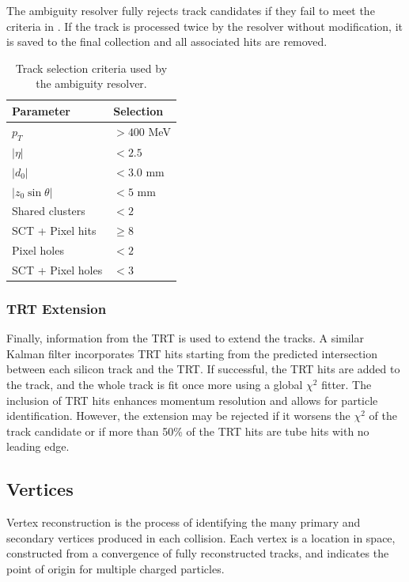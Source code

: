 The ambiguity resolver fully rejects track candidates if they fail to meet the criteria in .
If the track is processed twice by the resolver without modification, it is saved to the final collection and all associated hits are removed.

\begin{table}[h!]
    \centering
    \begin{tabular}{ll}
        \toprule
        Parameter           & Selection   \\
        \midrule
        $p_T$               & $> 400$ MeV \\
        $|\eta|$            & $< 2.5$     \\
        $|d_0|$             & $< 3.0$ mm  \\
        $|z_0 \sin \theta|$ & $< 5$ mm    \\
        Shared clusters     & $< 2$       \\
        SCT + Pixel hits    & $\geq 8$    \\
        Pixel holes         & $< 2$       \\
        SCT + Pixel holes   & $< 3$       \\
        \bottomrule
    \end{tabular}
    \caption{Track selection criteria used by the ambiguity resolver.}
    \label{tab:track_criteria}
\end{table}

\subsubsection{TRT Extension}

Finally, information from the TRT is used to extend the tracks.
A similar Kalman filter incorporates TRT hits starting from the predicted intersection between each silicon track and the TRT.
If successful, the TRT hits are added to the track, and the whole track is fit once more using a global $\chi^2$ fitter.
The inclusion of TRT hits enhances momentum resolution and allows for particle identification.
However, the extension may be rejected if it worsens the $\chi^2$ of the track candidate or if more than 50\% of the TRT hits are tube hits with no leading edge.

\subsection{Vertices}

Vertex reconstruction is the process of identifying the many primary and secondary vertices produced in each collision.
Each vertex is a location in space, constructed from a convergence of fully reconstructed tracks, and indicates the point of origin for multiple charged particles.

